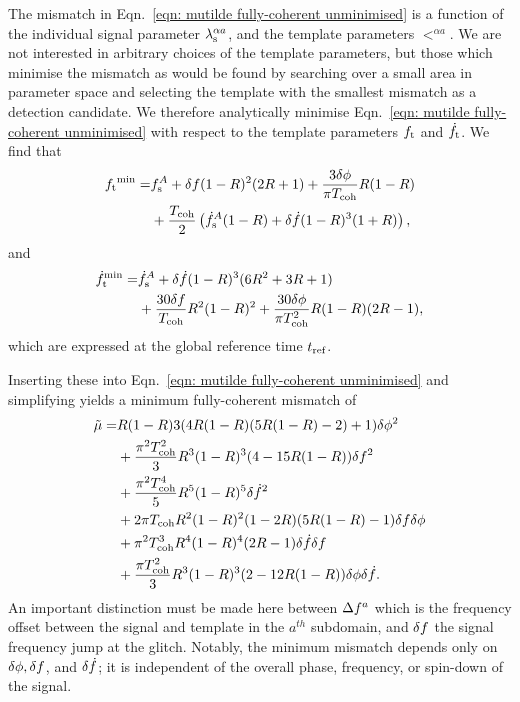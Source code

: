 \documentclass[../full_thesis/full_thesis.tex]{subfiles}
\begin{document}
The mismatch in Eqn.~\eqref{eqn: mutilde fully-coherent unminimised} is a
function of the individual signal parameter ${\lambda}_\textrm{s}^{\alpha a}$, and the template
parameters $\lt^{\alpha a}$. We are not interested in arbitrary choices of the template
parameters, but those which minimise the mismatch as would be found by
searching over a small area in parameter space and selecting the template with
the smallest mismatch as a detection candidate. We therefore
analytically minimise Eqn.~\eqref{eqn: mutilde fully-coherent unminimised} with
respect to the template parameters ${f_{\textrm{t}}}$ and $\dot{f}_{\textrm{t}}$.
We find that
\begin{align}
\begin{split}
{f_{\textrm{t}}}^{\textrm{min}} = &
f_{\textrm{s}}^A + \delta f(1-R)^2(2R+1)
      + \frac{3\delta\phi}{\pi T_{\mathrm{coh}}}R(1-R) \\
& + \frac{T_{\mathrm{coh}}}{2}\left(\dot{f}_{\textrm{s}}^A(1-R)+\delta\dot{f}(1-R)^{3}(1+R)\right),
\end{split}
\end{align}
and
\begin{align}
\begin{split}
\dot{f}_{\textrm{t}}^{\textrm{min}} = &
\dot{f}_{\textrm{s}}^{A} + \delta\dot{f}(1-R)^{3}(6R^{2} + 3R + 1) \\
& + \frac{30\delta f}{T_{\mathrm{coh}}} R^{2}(1-R)^{2} +
\frac{30\delta\phi}{\pi T_{\mathrm{coh}}^{2}} R (1-R)(2R-1),
\end{split}
\end{align}
which are expressed at the global reference time $t_{\textrm{ref}}$.

Inserting these into Eqn.~\eqref{eqn: mutilde fully-coherent unminimised} and
simplifying yields a minimum fully-coherent mismatch of
\begin{align}
\begin{split}
\tilde{\mu} = & R(1-R){3}(4R(1-R)(5R(1-R)-2) + 1)\delta\phi^{2} \\
& + \frac{\pi^{2}T_{\mathrm{coh}}^{2}}{3} R^{3}(1-R)^{3}(4 - 15R(1-R)) \delta f^{2}\\
& + \frac{\pi^{2}T_{\mathrm{coh}}^{4}}{5} R^{5}(1-R)^{5}\delta\dot{f}^{2} \\
& + 2\pi T_{\mathrm{coh}} R^{2}(1-R)^{2}(1-2R)(5R(1-R)-1)\delta f\delta\phi\\
& + \pi^{2} T_{\mathrm{coh}}^{3}R^{4}(1-R)^{4}(2R-1)\delta\dot{f}\delta f \\
& + \frac{\pi T_{\mathrm{coh}}^{2}}{3}R^{3}(1-R)^{3}(2-12R(1-R))\delta\phi\delta\dot{f}.
\end{split}
\label{eqn: mismatch fully-coherent glitch}
\end{align}
An important distinction must be made here between $\Delta f^{a}$ which is the
frequency offset between the signal and template in the $a^{th}$ subdomain, and $\delta f$
the signal frequency jump at the glitch. Notably, the minimum mismatch
depends only on $\delta\phi, \delta f$, and $\delta\dot{f}$; it is
independent of the overall phase, frequency, or spin-down of the signal.
\end{document}
